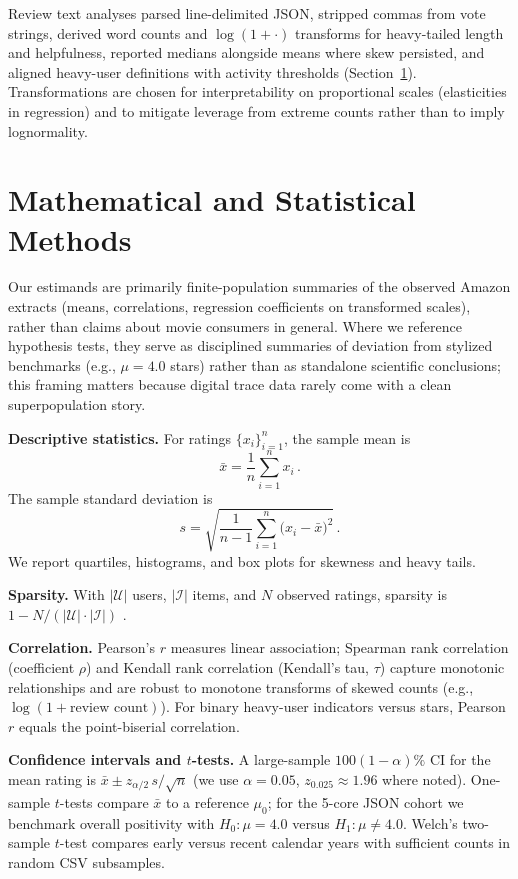 \documentclass[conference]{IEEEtran}
\begin{document}
Review text analyses parsed line-delimited JSON, stripped commas from vote strings, derived word counts and $\log(1+\cdot)$ transforms for heavy-tailed length and helpfulness, reported medians alongside means where skew persisted, and aligned heavy-user definitions with activity thresholds (Section~\ref{sec:methods}). Transformations are chosen for interpretability on proportional scales (elasticities in regression) and to mitigate leverage from extreme counts rather than to imply lognormality.

\section{Mathematical and Statistical Methods}
\label{sec:methods}

Our estimands are primarily finite-population summaries of the observed Amazon extracts (means, correlations, regression coefficients on transformed scales), rather than claims about movie consumers in general. Where we reference hypothesis tests, they serve as disciplined summaries of deviation from stylized benchmarks (e.g., $\mu=4.0$ stars) rather than as standalone scientific conclusions; this framing matters because digital trace data rarely come with a clean superpopulation story.

\textbf{Descriptive statistics.} For ratings $\{x_i\}_{i=1}^n$, the sample mean is
\begin{equation}
\bar{x}=\frac{1}{n}\sum_{i=1}^{n} x_i\,.
\end{equation}
The sample standard deviation is
\begin{equation}
s=\sqrt{\frac{1}{n-1}\sum_{i=1}^{n} \bigl(x_i-\bar{x}\bigr)^2}\,.
\end{equation}
We report quartiles, histograms, and box plots for skewness and heavy tails.

\textbf{Sparsity.} With $|\mathcal{U}|$ users, $|\mathcal{I}|$ items, and $N$ observed ratings, sparsity is $1-N/(|\mathcal{U}|\cdot|\mathcal{I}|)$ \cite{mcauley2018}.

\textbf{Correlation.} Pearson's $r$ measures linear association; Spearman rank correlation (coefficient $\rho$) and Kendall rank correlation (Kendall's tau, $\tau$) capture monotonic relationships and are robust to monotone transforms of skewed counts (e.g., $\log(1+\text{review count})$). For binary heavy-user indicators versus stars, Pearson $r$ equals the point-biserial correlation.

\textbf{Confidence intervals and $t$-tests.} A large-sample $100(1-\alpha)\%$ CI for the mean rating is $\bar{x}\pm z_{\alpha/2}\,s/\sqrt{n}$ (we use $\alpha=0.05$, $z_{0.025}\approx 1.96$ where noted). One-sample $t$-tests compare $\bar{x}$ to a reference $\mu_0$; for the 5-core JSON cohort we benchmark overall positivity with $H_0:\mu=4.0$ versus $H_1:\mu\neq 4.0$. Welch's two-sample $t$-test compares early versus recent calendar years with sufficient counts in random CSV subsamples.
\end{document}

